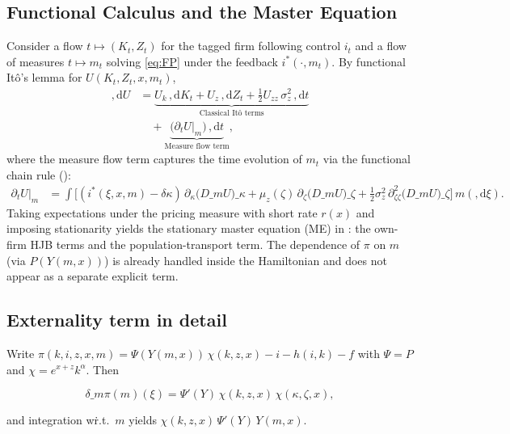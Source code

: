 ﻿\documentclass[11pt,letterpaper,oneside]{article}
\numberwithin{equation}{section}
\newcommand{\1}{\mathbf{1}}
\newcommand{\diff}{,\mathrm{d}}
\newcommand{\Dm}{D\_m}
\begin{document}
\begin{tcolorbox}[didacticstyle]
\begin{itemize}[leftmargin=1.1em,itemsep=0.25em]
\subsection*{Functional Calculus and the Master Equation}\label{app:master-derivation}
Consider a flow $t\mapsto (K_t,Z_t)$ for the tagged firm following control $i_t$ and a flow of measures $t\mapsto m_t$ solving \eqref{eq:FP} under the feedback $i^*(\cdot,m_t)$. By functional Itô's lemma for $U(K_t,Z_t,x,m_t)$,
\begin{align*}
\diff U &= \underbrace{U_k\,\diff K_t + U_z\,\diff Z_t + \tfrac12 U_{zz}\,\sigma_z^2\,\diff t}_{\text{Classical Itô terms}} \\
        &\quad + \underbrace{\big(\partial_t U\big|_{m}\big)\,\diff t}_{\text{Measure flow term}},
\end{align*}
where the measure flow term captures the time evolution of $m_t$ via the functional chain rule ():
\begin{align*}
\partial_t U\big|_{m} &= \int \Big[ (i^*(\xi,x,m)-\delta\kappa)\,\partial_{\kappa}\big(\Dm U\big)\!\_\kappa
  +\mu_z(\zeta)\,\partial_{\zeta}\big(\Dm U\big)\!\_\zeta
  +\tfrac12\sigma_z^2\,\partial_{\zeta\zeta}^2\big(\Dm U\big)\!\_\zeta\Big] \, m(\diff \xi).
\end{align*}
Taking expectations under the pricing measure with short rate $r(x)$ and imposing stationarity yields the stationary master equation (ME) in : the own-firm HJB terms and the population-transport term. The dependence of $\pi$ on $m$ (via $P(Y(m,x))$) is already handled inside the Hamiltonian and does not appear as a separate explicit term.

\subsection*{Externality term in detail}
Write $\pi(k,i,z,x,m)=\Psi(Y(m,x))\,\chi(k,z,x)-i-h(i,k)-f$ with $\Psi=P$ and $\chi=e^{x+z}k^\alpha$. Then

$$
\delta\_m\pi(m)(\xi)=\Psi'(Y)\,\chi(k,z,x)\,\chi(\kappa,\zeta,x),
$$

and integration w\.r.t.\ $m$ yields $\chi(k,z,x)\,\Psi'(Y)\,Y(m,x)$.




\end{itemize}
\end{tcolorbox}
\end{document}
